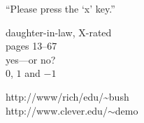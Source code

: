 \documentclass{article}
\begin{document}
    ``Please press the `x' key.''

    daughter-in-law, X-rated\\
    pages 13--67\\
    yes---or no?\\
    $0$, $1$ and $-1$

    http://www/rich/edu/\~{}bush \\
    http://www.clever.edu/$\sim$demo
    
\end{document}
